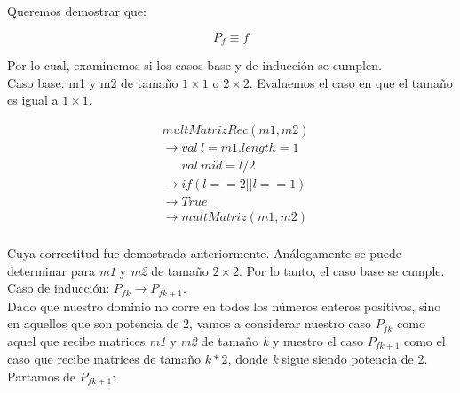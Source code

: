 \documentclass{article}
\begin{document}
Queremos demostrar que:

\begin{equation*}
    P_f \equiv f
\end{equation*}

Por lo cual, examinemos si los casos base y de inducción se cumplen.\\

Caso base: m1 y m2 de tamaño \(1 \times 1\) o \(2 \times 2\). Evaluemos el caso en que el tamaño es igual a \(1 \times 1\).

\begin{align*}
    &multMatrizRec(m1, m2)\\
    &\rightarrow val \ l = m1.length = 1\\
    &\quad \; \; val \ mid = l/2\\
    &\rightarrow if (l == 2 || l == 1)\\
    &\rightarrow True\\
    &\rightarrow multMatriz(m1,m2)\\
\end{align*}

Cuya correctitud fue demostrada anteriormente. Análogamente se puede determinar para \textit{m1} y \textit{m2} de tamaño \(2 \times 2\). Por lo tanto, el caso base se cumple.\\

Caso de inducción: \(P_{fk} \rightarrow P_{fk+1}\).\\

Dado que nuestro dominio no corre en todos los números enteros positivos, sino en aquellos que son potencia de 2, vamos a considerar nuestro caso \(P_{fk}\) como aquel que recibe matrices \textit{m1} y \textit{m2} de tamaño \textit{k} y nuestro el caso \(P_{fk+1}\) como el caso que recibe matrices de tamaño \(k*2\), donde \textit{k} sigue siendo potencia de 2.\\

Partamos de \(P_{fk+1}\):
\end{document}
